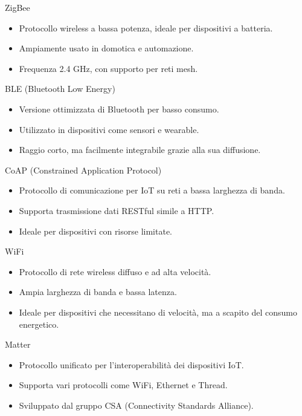 \documentclass{beamer}
\begin{document}
	\begin{frame}{ZigBee}
		\begin{itemize}
			\item Protocollo wireless a bassa potenza, ideale per dispositivi a batteria.
			\item Ampiamente usato in domotica e automazione.
			\item Frequenza 2.4 GHz, con supporto per reti mesh.
		\end{itemize}
	\end{frame}
	
	\begin{frame}{BLE (Bluetooth Low Energy)}
		\begin{itemize}
			\item Versione ottimizzata di Bluetooth per basso consumo.
			\item Utilizzato in dispositivi come sensori e wearable.
			\item Raggio corto, ma facilmente integrabile grazie alla sua diffusione.
		\end{itemize}
	\end{frame}
	
	\begin{frame}{CoAP (Constrained Application Protocol)}
		\begin{itemize}
			\item Protocollo di comunicazione per IoT su reti a bassa larghezza di banda.
			\item Supporta trasmissione dati RESTful simile a HTTP.
			\item Ideale per dispositivi con risorse limitate.
		\end{itemize}
	\end{frame}
	
	\begin{frame}{WiFi}
		\begin{itemize}
			\item Protocollo di rete wireless diffuso e ad alta velocità.
			\item Ampia larghezza di banda e bassa latenza.
			\item Ideale per dispositivi che necessitano di velocità, ma a scapito del consumo energetico.
		\end{itemize}
	\end{frame}
	
	\begin{frame}{Matter}
		\begin{itemize}
			\item Protocollo unificato per l'interoperabilità dei dispositivi IoT.
			\item Supporta vari protocolli come WiFi, Ethernet e Thread.
			\item Sviluppato dal gruppo CSA (Connectivity Standards Alliance).
		\end{itemize}
	\end{frame}
	
\end{document}
